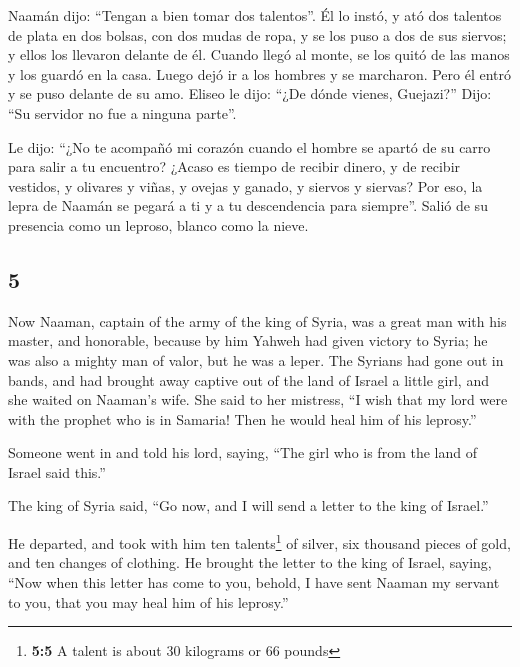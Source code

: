 \begin{paracol}{2}
 Naamán dijo: ``Tengan a bien tomar dos talentos''. Él lo
instó, y ató dos talentos de plata en dos bolsas, con dos mudas de ropa,
y se los puso a dos de sus siervos; y ellos los llevaron delante de él.
 Cuando llegó al monte, se los quitó de las manos y los
guardó en la casa. Luego dejó ir a los hombres y se marcharon.
 Pero él entró y se puso delante de su amo. Eliseo le
dijo: ``¿De dónde vienes, Guejazi?'' Dijo: ``Su servidor no fue a
ninguna parte''.

 Le dijo: ``¿No te acompañó mi corazón cuando el hombre
se apartó de su carro para salir a tu encuentro? ¿Acaso es tiempo de
recibir dinero, y de recibir vestidos, y olivares y viñas, y ovejas y
ganado, y siervos y siervas?  Por eso, la lepra de Naamán
se pegará a ti y a tu descendencia para siempre''. Salió de su presencia
como un leproso, blanco como la nieve.

\switchcolumn
\begin{otherlanguage}{english}

\hypertarget{section-9}{%
\section{5}\label{section-9}}

 Now Naaman, captain of the army of the king of Syria, was
a great man with his master, and honorable, because by him Yahweh had
given victory to Syria; he was also a mighty man of valor, but he was a
leper.  The Syrians had gone out in bands, and had brought
away captive out of the land of Israel a little girl, and she waited on
Naaman's wife.  She said to her mistress, ``I wish that my
lord were with the prophet who is in Samaria! Then he would heal him of
his leprosy.''

 Someone went in and told his lord, saying, ``The girl who
is from the land of Israel said this.''

 The king of Syria said, ``Go now, and I will send a
letter to the king of Israel.''

He departed, and took with him ten talents\footnote{\textbf{5:5} A
  talent is about 30 kilograms or 66 pounds} of silver, six thousand
pieces of gold, and ten changes of clothing.  He brought
the letter to the king of Israel, saying, ``Now when this letter has
come to you, behold, I have sent Naaman my servant to you, that you may
heal him of his leprosy.''


\end{otherlanguage}
\end{paracol}
